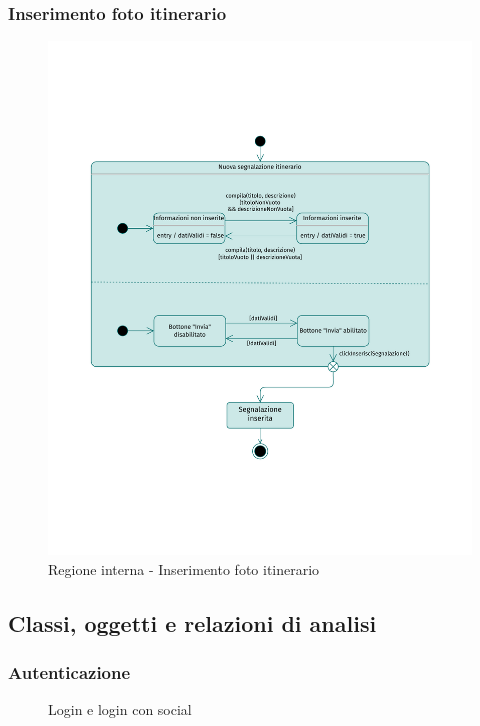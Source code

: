 \documentclass{natourDoc}
\begin{document}
\subsubsection{Inserimento foto itinerario}
\begin{figure}[!htbp]
	\centering
	\includegraphics[width=\textwidth, page=5]{./diagrams/statechart.pdf}
	\caption{Regione interna - Inserimento foto itinerario}
\end{figure}
\FloatBarrier

\newpage
\subsection{Classi, oggetti e relazioni di analisi}
\subsubsection{Autenticazione}
\begin{figure}[!htbp]
	\centering
	
	\caption{Login e login con social}
\end{figure}
\FloatBarrier
\end{document}
